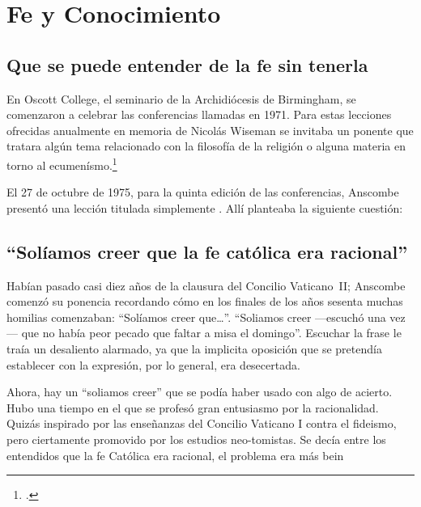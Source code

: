 \section{Fe y Conocimiento}

\subsection{Que se puede entender de la fe sin tenerla}  
En Oscott College, el seminario de la Archidiócesis de Birmingham, se
  comenzaron a celebrar las conferencias llamadas 
  en 1971. Para estas lecciones ofrecidas anualmente en memoria de Nicolás
  Wiseman se invitaba un ponente que tratara algún tema relacionado con la
  filosofía de la religión o alguna materia en torno al
  ecumenísmo.\footcite[cf.~][p.~7]{wisemanlects}

  El 27 de octubre de 1975, para la quinta edición de las conferencias, Anscombe
  presentó una lección titulada simplemente . Allí planteaba la
  siguiente cuestión: 



\subsection{``Solíamos creer que la fe católica era racional''} Habían pasado
casi diez años de la clausura del Concilio \mbox{Vaticano II}; Anscombe comenzó
su ponencia recordando cómo en los finales de los años sesenta muchas homilias
comenzaban: ``Solíamos creer que\ldots''. ``Soliamos creer ---escuchó una vez---
que no había peor pecado que faltar a misa el domingo''. Escuchar la frase le
traía un desaliento alarmado, ya que la implicita oposición que se pretendía
establecer con la expresión, por lo general, era desecertada.

Ahora, hay un ``soliamos creer'' que se podía haber usado con algo de acierto.
Hubo una tiempo en el que se profesó gran entusiasmo por la racionalidad. Quizás
inspirado por las enseñanzas del Concilio Vaticano I contra el fideismo, pero
ciertamente promovido por los estudios neo-tomistas. Se decía entre los
entendidos que la fe Católica era racional, el problema era más bein

